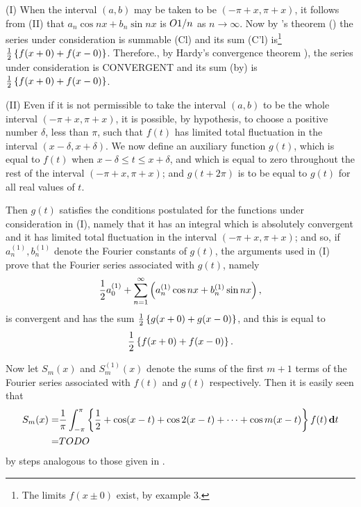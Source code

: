 (I) When the interval $(a, b)$ may be taken to be $(-\pi + x, \pi + x)$,
it follows from (II) %
that $a_{n} \cos nx + b_{n} \sin nx$ is $O{1/n}$ as
$n \rightarrow \infty$. Now by \Fejer's theorem ()
the series under consideration
is summable (Cl) %
and its sum (C'l) %
is\footnote{The limits $f(x \pm 0)$ exist, by example 3.%
}
$\frac{1}{2} \left\{ f(x+0) + f(x-0) \right\}$. Therefore.,
by Hardy's convergence theorem ), the series under consideration
is CONVERGENT %
and its sum (by) is
$\frac{1}{2} \left\{ f(x+0) + f(x-0) \right\}$.

(II) %
Even if it is not permissible to take the interval $(a, b)$ to be
the whole interval $(-\pi + x, \pi + x)$, it is possible, by
hypothesis, to choose a positive number $\delta$, less than $\pi$,
such that $f(t)$
has limited total fluctuation in the interval $(x-\delta, x+\delta)$.
We now define an auxiliary function $g(t)$, which is equal to $f(t)$ when
$x - \delta \leq t \leq x + \delta$,
and which is equal to zero throughout the rest of the interval
$(-\pi + x, \pi + x)$; and $g(t + 2\pi)$ is to be equal to $g(t)$ for all real
values of $t$.

Then $g(t)$ satisfies the conditions postulated for the functions under
consideration in (I),%
namely that it has an integral which is
absolutely convergent and it has limited total fluctuation in the
interval $(-\pi + x, \pi + x)$; and so, if
$a_{n}^{(1)}, b_{n}^{(1)}$ denote the Fourier
constants of $g(t)$, the arguments used in (I) %
prove that the Fourier
series associated with $g(t)$, namely
$$
\frac{1}{2} a_{0}^{(1)}
+
\sum_{n=1}^{\infty}
\left( 
  a_{n}^{(1)} \cos nx
  +
  b_{n}^{(1)} \sin nx
 \right),
$$
is convergent and has the sum
$\frac{1}{2} \left\{ g(x+0) + g(x-0) \right\}$, and this is
equal to
$$
\frac{1}{2} \left\{ 
  f(x+0) + f(x-0)
 \right\}.
$$
%
%

Now let $S_{m}(x)$ and $S_{m}^{(1)} (x)$ denote the sums of the first $m + 1$
terms of the Fourier series associated with $f(t)$ and $g(t)$ respectively. Then
it is easily seen that
\begin{align*}
  S_{m}(x)
  =&
  \frac{1}{\pi}
  \int_{-\pi}^{\pi} \left\{ 
    \frac{1}{2}
    + \cos (x-t)
    + \cos 2(x-t)
    + \cdots
    + \cos m(x-t)
   \right\}
  f(t) \, \mathbf{d} t
  \\
  =&
  TODO
\end{align*}
by steps analogous to those given in .

